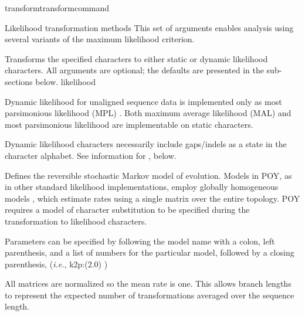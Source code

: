 \begin{command}{transform}{transformcommand}
\begin{arguments}
        \begin{argumentgroup}{Likelihood transformation methods}
            This set of arguments enables analysis using several variants of the
            maximum likelihood criterion. 

                {Transforms the specified characters to either static or dynamic
                likelihood characters. All arguments are optional; the defaults
                are presented in the sub-sections below.}
                {likelihood}

            \begin{statement}
                Dynamic likelihood for unaligned sequence data is
                implemented only as most parsimonious likelihood (MPL)
                \cite{barryandhartigan1987}. Both maximum average likelihood (MAL) and
                most parsimonious likelihood are implementable on static
                characters.
            \end{statement}

            \begin{statement}
                Dynamic likelihood characters necessarily include gaps/indels as
                a state in the character alphabet. See information for
                , below.
            \end{statement}

                {Defines the reversible stochastic Markov model of evolution.
                Models in POY, as in other standard likelihood implementations,
                employ globally homogeneous models \cite{jayaswal2005estimation}, which
                estimate rates using a single matrix over the entire topology.
                POY requires a model of character substitution to be specified
                during the transformation to likelihood characters.

                Parameters can be specified by following the model name with a
                colon, left parenthesis, and a list of numbers for the
                particular model, followed by a closing parenthesis, (\emph{i.e.},
                k2p:(2.0) )

                \begin{statement}
                    All matrices are normalized so the mean rate is one. This
                    allows branch lengths to represent the expected number of
                    transformations averaged over the sequence length.
                \end{statement}

}
\end{argumentgroup}
\end{arguments}
\end{command}
